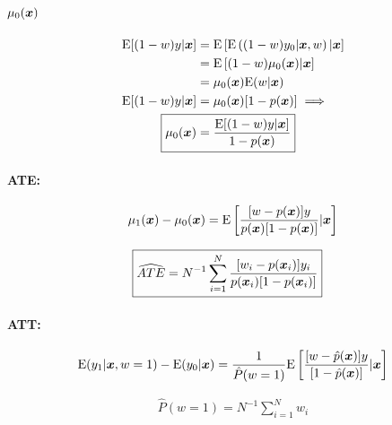 \documentclass[11pt, oneside, a4paper, article]{article}
\numberwithin{equation}{section}
\begin{document}
\begin{description}
\paragraph{$\mu_{0}( \boldsymbol{x} )$}

\vspace{-1 em}
\begin{align*}
	\E[ (1-w) y | \xvec ] &= \E\left[  \E \left( (1 - w) y_{0} | \xvec, w  \right) | \xvec \right]
	\\ &=
	\E \left[ (1 - w) \mu_{0}(\xvec) | \xvec \right]
	\\ &=
	\mu_{0}(\xvec) \E(w | \xvec )
	\\ 
	\E[ (1-w) y | \xvec ] 
	&=
	\mu_{0}(\xvec) [1 - p(\xvec)] \implies
	\\ 
	\Aboxed{
		\mu_{0}(\xvec)
		&=
	\frac{\E[ (1-w) y | \xvec ] }{1 - p( \xvec ) } }
\end{align*}

\paragraph{ATE:}

\begin{align*}
	\mu_{1}(\boldsymbol{x}) - \mu_{0}(\boldsymbol{x}) =
	\text{E}\left[ 
		\frac{[w - p(\boldsymbol{x})] y}{p(\boldsymbol{x}) [1 - p(\boldsymbol{x})]}
		| \boldsymbol{x}
	\right]
\end{align*}

\begin{align*}
	\Aboxed{
		\widehat{ATE} =
		N^{-1} \sum_{i=1}^{N}
		\frac{[ w_{i} - p(\xvec_{i} ) ] y_{i} }{ p( \xvec_{i} ) [1 - p( \xvec_{i} ) ] }
	}
\end{align*}

\paragraph{ATT:}

\begin{align*}
	\text{E}( y_{1} | \boldsymbol{x}, w=1) - \text{E}(y_{0} | \boldsymbol{x}) =
	\frac{1}{\hat{P}(w=1)}
	\text{E}\left[ 
		\frac{[w - \hat{p}(\boldsymbol{x})] y}{[ 1 - \hat{p}(\boldsymbol{x}) ]}
		| \boldsymbol{x}
	\right]
\end{align*}

\vspace{-1 em}
\begin{align*}
	\hat{P} (w = 1) = N^{-1} \sum_{i=1}^{N} w_{i}
\end{align*}


\end{description}
\end{document}
